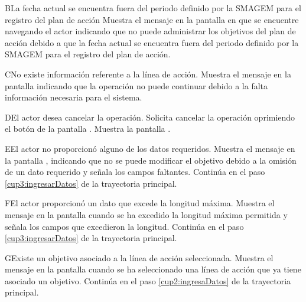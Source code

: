   \begin{UCtrayectoriaA}{B}{La fecha actual se encuentra fuera del periodo definido por la SMAGEM para el registro del plan de acción}
    \UCpaso[\UCsist] Muestra el mensaje  en la pantalla en que se encuentre navegando el actor indicando que no puede administrar los objetivos del plan de acción debido a que la fecha actual se encuentra fuera del periodo definido por la SMAGEM para el registro del plan de acción.
 \end{UCtrayectoriaA}
 
\begin{UCtrayectoriaA}{C}{No existe información referente a la línea de acción.}
	\UCpaso[\UCsist] Muestra el mensaje  en la pantalla  indicando que la operación no puede continuar debido a la falta información necesaria para el sistema.
\end{UCtrayectoriaA}

\begin{UCtrayectoriaA}{D}{El actor desea cancelar la operación.}
	\UCpaso[\UCactor] Solicita cancelar la operación oprimiendo el botón  de la pantalla .
	\UCpaso[\UCsist] Muestra la pantalla  .
\end{UCtrayectoriaA} 

\begin{UCtrayectoriaA}{E}{El actor no proporcionó alguno de los datos requeridos.}
	\UCpaso[\UCsist] Muestra el mensaje  en la pantalla ,
	indicando que no se puede modificar el objetivo debido a la omisión de un dato requerido y señala los campos faltantes.
	\UCpaso[] Continúa en el paso \ref{cup3:ingresarDatos} de la trayectoria principal.
\end{UCtrayectoriaA}

\begin{UCtrayectoriaA}{F}{El actor proporcionó un dato que excede la longitud máxima.}
	\UCpaso[\UCsist] Muestra el mensaje  en la pantalla 
	cuando se ha excedido la longitud máxima permitida y señala los campos que excedieron la longitud.
	\UCpaso[] Continúa en el paso \ref{cup3:ingresarDatos} de la trayectoria principal.
\end{UCtrayectoriaA}

\begin{UCtrayectoriaA}{G}{Existe un objetivo asociado a la línea de acción seleccionada.}
	\UCpaso[\UCsist] Muestra el mensaje  en la pantalla 
	cuando se ha seleccionado una línea de acción que ya tiene asociado un objetivo.
	\UCpaso[] Continúa en el paso \ref{cup2:ingresaDatos} de la trayectoria principal.
\end{UCtrayectoriaA}
 